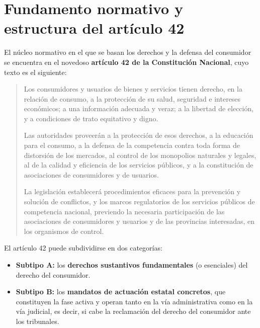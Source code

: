 \documentclass[12pt,oneside]{book}
\begin{document}
\section{Fundamento normativo y estructura del art\'iculo 42}

El n\'ucleo normativo en el que se basan los derechos y la defensa del consumidor se encuentra en el novedoso \textbf{art\'iculo 42 de la Constituci\'on Nacional}, cuyo texto es el siguiente:

\begin{quote}
Los consumidores y usuarios de bienes y servicios tienen derecho, en la relaci\'on de consumo, a la protecci\'on de su salud, seguridad e intereses econ\'omicos; a una informaci\'on adecuada y veraz; a la libertad de elecci\'on, y a condiciones de trato equitativo y digno.

Las autoridades proveer\'an a la protecci\'on de esos derechos, a la educaci\'on para el consumo, a la defensa de la competencia contra toda forma de distorsi\'on de los mercados, al control de los monopolios naturales y legales, al de la calidad y eficiencia de los servicios p\'ublicos, y a la constituci\'on de asociaciones de consumidores y de usuarios.

La legislaci\'on establecer\'a procedimientos eficaces para la prevenci\'on y soluci\'on de conflictos, y los marcos regulatorios de los servicios p\'ublicos de competencia nacional, previendo la necesaria participaci\'on de las asociaciones de consumidores y usuarios y de las provincias interesadas, en los organismos de control.
\end{quote}

El art\'iculo 42 puede subdividirse en dos categor\'ias:

\begin{itemize}
    \item \textbf{Subtipo A:} los \textbf{derechos sustantivos fundamentales} (o esenciales) del derecho del consumidor.
    \item \textbf{Subtipo B:} los \textbf{mandatos de actuaci\'on estatal concretos}, que constituyen la fase activa y operan tanto en la v\'ia administrativa como en la v\'ia judicial, es decir, si cabe la reclamaci\'on del derecho del consumidor ante los tribunales.
\end{itemize}
\end{document}

